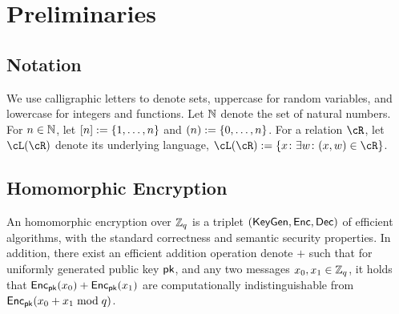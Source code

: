 \section{Preliminaries}\label{sec:Preliminaries}

\subsection{Notation} 
We use calligraphic letters to denote sets, uppercase for random variables, and lowercase for integers and functions. %
Let ${\mathbb{N}}$ denote the set of natural numbers.  For $n\in {\mathbb{N}}$, let $[n] \eqdef \set{1,\ldots,n}$ and $(n) \eqdef \set{0,\ldots,n}$.  For a relation $\cR$, let $\cL(\cR)$ denote its underlying language, \ie  $\cL(\cR) \eqdef \set{x\colon \exists w \colon (x,w) \in \cR}$.    


\subsection{Homomorphic Encryption}

An homomorphic encryption over ${\mathbb Z}_q$ is a triplet $(\mathsf{KeyGen},\mathsf{Enc},\mathsf{Dec})$ of efficient algorithms, with the standard correctness and semantic security properties.  In addition, there exist an efficient  addition operation denote $+$  such that for uniformly  generated public key  ${\mathsf{pk}}$, and any two  messages $x_0,x_1\in {\mathbb Z}_q$,  it holds that  $\mathsf{Enc}_{\mathsf{pk}}(x_0) + \mathsf{Enc}_{\mathsf{pk}}(x_1) $ are computationally indistinguishable from $\mathsf{Enc}_{\mathsf{pk}}(x_0+ x_1 \bmod q)$.
